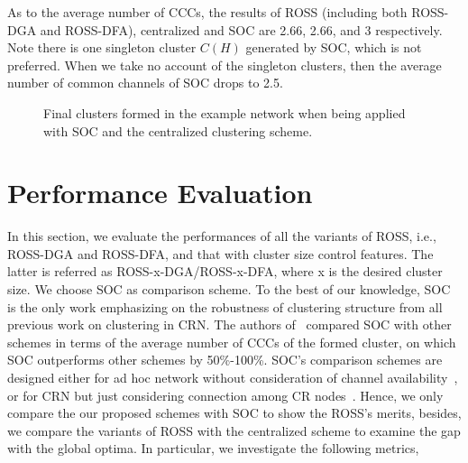 \documentclass[10pt,journal,compsoc]{IEEEtran}
\theoremstyle{mytheoremstyle}
\theoremstyle{mytheoremstyle}
\theoremstyle{mytheoremstyle}
\newcommand{\ie}{i.e., }
\begin{document}
As to the average number of CCCs, the results of ROSS (including both ROSS-DGA and ROSS-DFA), centralized and SOC are 2.66, 2.66, and 3 respectively. 
Note there is one singleton cluster $C(H)$ generated by SOC, which is not preferred.
When we take no account of the singleton clusters, then the average number of common channels of SOC drops to 2.5. 
\begin{figure}[ht]
\begin{center}
\hspace{0.15 in}
\end{center}
\caption{Final clusters formed in the example network when being applied with SOC and the centralized clustering scheme.}
\label{fig:final_clustering}
\end{figure}

 





\section{Performance Evaluation}
\label{performance}
In this section, we evaluate the performances of all the variants of ROSS, \ie ROSS-DGA and ROSS-DFA, and that with cluster size control features.
The latter is referred as ROSS-x-DGA/ROSS-x-DFA, where x is the desired cluster size.
We choose SOC as comparison scheme.
To the best of our knowledge, SOC~\cite{Lazos09} is the only work emphasizing on the robustness of clustering structure from all previous work on clustering in CRN. 
The authors of~\cite{Lazos09} compared SOC with other schemes in terms of the average number of CCCs of the formed cluster, on which SOC outperforms other schemes by 50\%-100\%. 
SOC's comparison schemes are designed either for ad hoc network without consideration of channel availability~\cite{Basagni99}, or for CRN but just considering connection among CR nodes~\cite{Zhao07}.
Hence, we only compare the our proposed schemes with SOC to show the ROSS's merits, besides, we compare the variants of ROSS with the centralized scheme to examine the gap with the global optima.
In particular, we investigate the following metrics,
\end{document}
